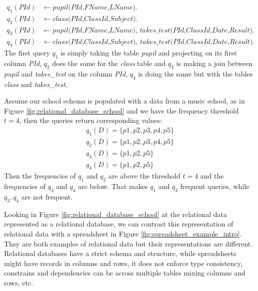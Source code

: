 \begin{equation*}
\begin{aligned}
q_1(\textit{PId})&\leftarrow \textit{pupil(PId,FName,LName)}.\\
q_2(\textit{PId})&\leftarrow \textit{class(PId,ClassId,Subject)}. \\
q_3(\textit{PId})&\leftarrow \textit{pupil(PId,FName,LName), takes\_test(PId,ClassId,Date,Result)}.\\
q_4(\textit{PId})&\leftarrow \textit{class(PId,ClassId,Subject), takes\_test(PId,ClassId,Date,Result)}.
\end{aligned}
\end{equation*}
The first query $q_1$ is simply taking the table \textit{pupil} and projecting
on its first column \textit{PId}, $q_2$ does the same for the
\textit{class} table and $q_3$ is making a join between \textit{pupil}
and \textit{takes\_test} on the column \textit{PId}, $q_4$ is doing the same
but with the tables \textit{class} and \textit{takes\_test}.

Assume our school schema is populated with a data from a music school,
as in Figure \ref{fig:relational_database_school} and we have the
frequency threshold $t=4$, then the queries return corresponding
values:
\begin{equation*}
\begin{aligned}
    q_1(D) = \{ p1, p2, p3, p4, p5 \} \\
    q_2(D) = \{ p1, p2, p3, p4, p5 \} \\
    q_3(D) = \{ p1, p2, p5 \} \\
    q_4(D) = \{ p1, p2, p5 \} 
\end{aligned}
\end{equation*}
Then the frequencies of $q_1$ and $q_2$ are above the threshold $t=4$
and the frequencies of $q_3$ and $q_4$ are below. That makes $q_1$ and
$q_2$ frequent queries, while $q_3,q_4$ are not frequent.

Looking in Figure
\ref{fig:relational_database_school} at the relational data represented
as a relational database, we can contrast this representation of
relational data with a spreadsheet in Figure
\ref{fig:spreadsheet_example_intro}. They are both examples of
relational data but their representations are different. 
Relational databases have a strict schema and structure, while
spreadsheets might have records in columns and rows, it does not
enforce type consistency, constrains and dependencies can be across
multiple tables mixing columns and rows, etc.

